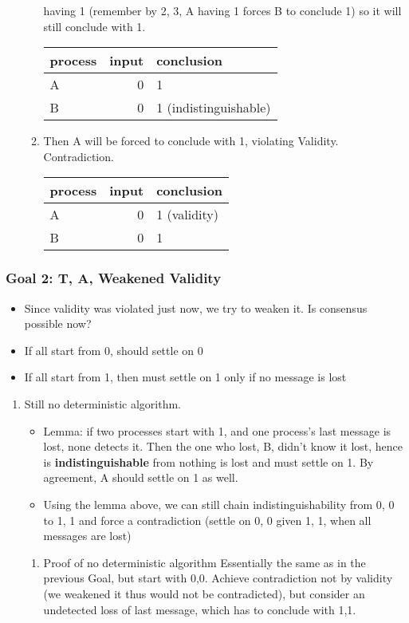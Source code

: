 \documentclass[11pt]{article}
\begin{document}
\begin{enumerate}
\begin{enumerate}
having 1 (remember by 2, 3, A having 1 forces B to conclude 1) so it will
still conclude with 1.
\begin{center}
\begin{tabular}{lrl}
process & input & conclusion\\
\hline
A & 0 & 1\\
B & 0 & 1 (indistinguishable)\\
\end{tabular}
\end{center}
\item Then A will be forced to conclude with 1, violating Validity. Contradiction.
\begin{center}
\begin{tabular}{lrl}
process & input & conclusion\\
\hline
A & 0 & 1 (validity)\\
B & 0 & 1\\
\end{tabular}
\end{center}
\end{enumerate}
\end{enumerate}
\subsubsection{Goal 2: T, A, Weakened Validity}
\label{sec:org207c442}
\begin{itemize}
\item Since validity was violated just now, we try to weaken it. Is consensus
possible now?
\item If all start from 0, should settle on 0
\item If all start from 1, then must settle on 1 only if no message is lost
\end{itemize}
\begin{enumerate}
\item Still no deterministic algorithm.
\label{sec:org28c5a54}
\begin{itemize}
\item Lemma: if two processes start with 1, and one process's last message is lost,
none detects it. Then the one who lost, B, didn't know it lost, hence is
\textbf{indistinguishable} from nothing is lost and must settle on 1. By agreement, A
should settle on 1 as well.
\item Using the lemma above, we can still chain indistinguishability from 0, 0 to 1,
1 and force a contradiction (settle on 0, 0 given 1, 1, when all messages are
lost)
\end{itemize}
\begin{enumerate}
\item Proof of no deterministic algorithm
\label{sec:org0ec75f4}
Essentially the same as in the previous Goal, but start with 0,0. Achieve
contradiction not by validity (we weakened it thus would not be contradicted),
but consider an undetected loss of last message, which has to conclude with 1,1.
\end{enumerate}
\end{enumerate}
\end{document}
